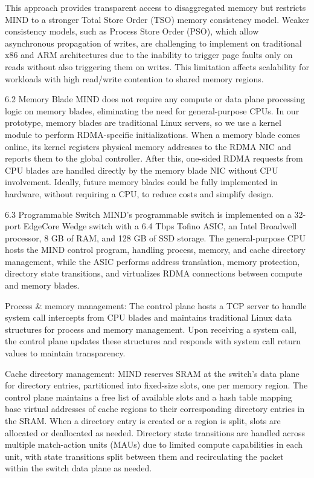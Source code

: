 This approach provides transparent access to disaggregated memory but restricts MIND to a stronger Total Store Order (TSO) memory consistency model. Weaker consistency models, such as Process Store Order (PSO), which allow asynchronous propagation of writes, are challenging to implement on traditional x86 and ARM architectures due to the inability to trigger page faults only on reads without also triggering them on writes. This limitation affects scalability for workloads with high read/write contention to shared memory regions.

6.2 Memory Blade
MIND does not require any compute or data plane processing logic on memory blades, eliminating the need for general-purpose CPUs. In our prototype, memory blades are traditional Linux servers, so we use a kernel module to perform RDMA-specific initializations. When a memory blade comes online, its kernel registers physical memory addresses to the RDMA NIC and reports them to the global controller. After this, one-sided RDMA requests from CPU blades are handled directly by the memory blade NIC without CPU involvement. Ideally, future memory blades could be fully implemented in hardware, without requiring a CPU, to reduce costs and simplify design.

6.3 Programmable Switch
MIND’s programmable switch is implemented on a 32-port EdgeCore Wedge switch with a 6.4 Tbps Tofino ASIC, an Intel Broadwell processor, 8 GB of RAM, and 128 GB of SSD storage. The general-purpose CPU hosts the MIND control program, handling process, memory, and cache directory management, while the ASIC performs address translation, memory protection, directory state transitions, and virtualizes RDMA connections between compute and memory blades.

Process \& memory management: The control plane hosts a TCP server to handle system call intercepts from CPU blades and maintains traditional Linux data structures for process and memory management. Upon receiving a system call, the control plane updates these structures and responds with system call return values to maintain transparency.

Cache directory management: MIND reserves SRAM at the switch’s data plane for directory entries, partitioned into fixed-size slots, one per memory region. The control plane maintains a free list of available slots and a hash table mapping base virtual addresses of cache regions to their corresponding directory entries in the SRAM. When a directory entry is created or a region is split, slots are allocated or deallocated as needed. Directory state transitions are handled across multiple match-action units (MAUs) due to limited compute capabilities in each unit, with state transitions split between them and recirculating the packet within the switch data plane as needed.

